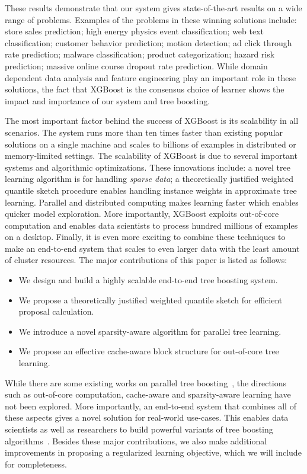 \documentclass{sig-alternate-05-2015}
\begin{document}
These results demonstrate that our system gives state-of-the-art results on a wide range of problems. Examples of the problems in these winning solutions include: store sales prediction; high energy physics event classification; web text classification; customer behavior prediction; motion detection; ad click through rate prediction; malware classification; product categorization; hazard risk prediction; massive online course dropout rate prediction.
While domain dependent data analysis and feature engineering play an important role in these solutions, the fact that XGBoost is the consensus choice of learner shows the impact and importance of our system and tree boosting.

The most important factor behind the success of XGBoost is its scalability in all scenarios.
The system runs more than ten times faster than existing popular solutions on a single machine and scales to billions of examples in distributed or memory-limited settings.
The scalability of XGBoost is due to several important systems and algorithmic optimizations.  These innovations include:
a novel tree learning algorithm is for handling \emph{sparse data}; a theoretically justified weighted quantile sketch procedure enables handling instance weights in
 approximate tree learning.
Parallel and distributed computing makes learning faster which enables quicker model exploration.
More importantly, XGBoost exploits out-of-core computation and enables data scientists to process hundred millions of examples on a desktop.
Finally, it is even more exciting to combine these techniques to make an end-to-end system that scales to even larger data with the least amount of cluster resources.
The major contributions of this paper is listed as follows:
\begin{itemize}
  \item We design and build a highly scalable end-to-end tree boosting system.
  \item We propose a theoretically justified weighted quantile sketch for efficient proposal calculation.
  \item We introduce a novel sparsity-aware algorithm for parallel tree learning.
  \item We propose an effective cache-aware block structure for out-of-core tree learning.
\end{itemize}

While there are some existing works on parallel tree boosting~\cite{tyree2011parallel,Ye:GBDT,PLANet},
the directions such as out-of-core computation, cache-aware and sparsity-aware learning have not been explored.
More importantly, an end-to-end system that combines all of these aspects gives a novel solution for real-world use-cases. This enables data scientists as well as researchers to build powerful variants of tree boosting algorithms~\cite{Chen:ICML2013,Chen:AISTATS2015}.
Besides these major contributions, we also make additional improvements in proposing a regularized learning objective, which we will include for completeness.
\end{document}
